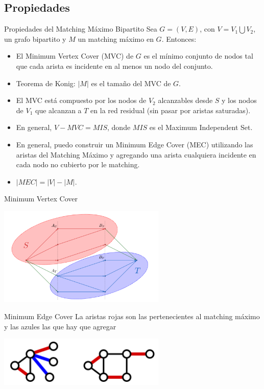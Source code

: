 \documentclass{beamer}
\begin{document}
\subsection{ Propiedades }

\begin{frame}{Propiedades del Matching Máximo Bipartito}
    Sea $G=(V,E)$, con $V = V_1 \bigcup V_2$, un grafo bipartito y $M$ un matching máximo en $G$. Entonces:
    
    \begin{itemize}
        \item El Minimum Vertex Cover (MVC) de $G$ es el mínimo conjunto de nodos tal que cada arista es incidente en al menos un nodo del conjunto.
        \pause
        \item Teorema de Konig: $|M|$ es el tamaño del MVC de $G$.
        \pause
        \item El MVC está compuesto por los nodos de $V_2$ alcanzables desde $S$ y los nodos de $V_1$ que alcanzan a $T$ en la red residual (sin pasar por aristas saturadas).
        \pause
        \item En general, $V - MVC = MIS$, donde $MIS$ es el Maximum Independent Set.
        \pause 
        \item En general, puedo construir un Minimum Edge Cover (MEC) utilizando las aristas del Matching Máximo y agregando una arista cualquiera incidente en cada nodo no cubierto por le matching.
        \item $|MEC| = |V| - |M|$.
    \end{itemize}
\end{frame}
    
\begin{frame}{Minimum Vertex Cover}

    \begin{center}
        \includegraphics[width=0.6\textwidth]{imgs/mvc.png}
    \end{center}
\end{frame}

\begin{frame}{Minimum Edge Cover}
    La aristas rojas son las pertenecientes al matching máximo y las azules las que hay que agregar
    \begin{center}
        \includegraphics[width=0.6\textwidth]{imgs/mec.png}
    \end{center}
\end{frame}
\end{document}

